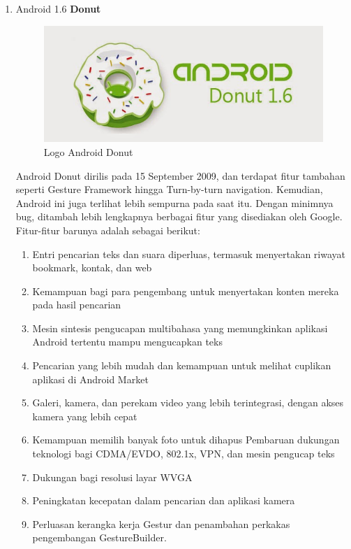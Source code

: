 \begin{enumerate}
\item Android 1.6 \textbf{Donut}\\
\begin{figure}[]
    \centering
    \includegraphics[scale=0.5]{pictures/android_donut.jpg}
    \caption{Logo Android Donut}
    \label{}
\end{figure}
Android Donut dirilis pada 15 September 2009, dan terdapat fitur tambahan seperti Gesture Framework hingga Turn-by-turn navigation. Kemudian, Android ini juga terlihat lebih sempurna pada saat itu. Dengan minimnya bug, ditambah lebih lengkapnya berbagai fitur yang disediakan oleh Google. Fitur-fitur barunya adalah sebagai berikut:
\begin{enumerate}
    \item Entri pencarian teks dan suara diperluas, termasuk menyertakan riwayat bookmark, kontak, dan web
    \item Kemampuan bagi para pengembang untuk menyertakan konten mereka pada hasil pencarian
    \item Mesin sintesis pengucapan multibahasa yang memungkinkan aplikasi Android tertentu mampu mengucapkan teks
    \item Pencarian yang lebih mudah dan kemampuan untuk melihat cuplikan aplikasi di Android Market
    \item Galeri, kamera, dan perekam video yang lebih terintegrasi, dengan akses kamera yang lebih cepat
    \item Kemampuan memilih banyak foto untuk dihapus
    Pembaruan dukungan teknologi bagi CDMA/EVDO, 802.1x, VPN, dan mesin pengucap teks
    \item Dukungan bagi resolusi layar WVGA
    \item Peningkatan kecepatan dalam pencarian dan aplikasi kamera
    \item Perluasan kerangka kerja Gestur dan penambahan perkakas pengembangan GestureBuilder.
\end{enumerate}


\end{enumerate}
